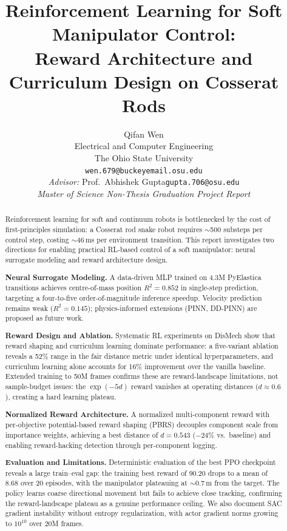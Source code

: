 \documentclass[11pt]{article}
\title{%
  \textbf{Reinforcement Learning for Soft Manipulator Control:}\\[0.3em]
  \large Reward Architecture and Curriculum Design on Cosserat Rods%
}
\author{%
  Qifan Wen\\
  \small Electrical and Computer Engineering\\
  \small The Ohio State University\\
  \small \texttt{wen.679@buckeyemail.osu.edu}\\[0.6em]
  \small \textit{Advisor:} Prof.\ Abhishek Gupta\quad\small\texttt{gupta.706@osu.edu}\\[1.5em]
  \small\textit{Master of Science Non-Thesis Graduation Project Report}%
}
\date{}
\begin{document}

\maketitle
\thispagestyle{empty}

\newpage

\begin{abstract}
\noindent
Reinforcement learning for soft and continuum robots is bottlenecked by the cost of first-principles simulation: a Cosserat rod snake robot requires ${\sim}$500 substeps per control step, costing ${\sim}$46\,ms per environment transition. This report investigates two directions for enabling practical RL-based control of a soft manipulator: neural surrogate modeling and reward architecture design.

\medskip\noindent\textbf{Neural Surrogate Modeling.}
A data-driven MLP trained on 4.3M PyElastica transitions achieves centre-of-mass position $R^2 = 0.852$ in single-step prediction, targeting a four-to-five order-of-magnitude inference speedup. Velocity prediction remains weak ($R^2 = 0.145$); physics-informed extensions (PINN, DD-PINN) are proposed as future work.

\medskip\noindent\textbf{Reward Design and Ablation.}
Systematic RL experiments on DisMech show that reward shaping and curriculum learning dominate performance: a five-variant ablation reveals a 52\% range in the fair distance metric under identical hyperparameters, and curriculum learning alone accounts for 16\% improvement over the vanilla baseline. Extended training to 50M frames confirms these are reward-landscape limitations, not sample-budget issues: the $\exp(-5d)$ reward vanishes at operating distances ($d \approx 0.6$), creating a hard learning plateau.

\medskip\noindent\textbf{Normalized Reward Architecture.}
A normalized multi-component reward with per-objective potential-based reward shaping (PBRS) decouples component scale from importance weights, achieving a best distance of $d = 0.543$ ($-$24\% vs.\ baseline) and enabling reward-hacking detection through per-component logging.

\medskip\noindent\textbf{Evaluation and Limitations.}
Deterministic evaluation of the best PPO checkpoint reveals a large train--eval gap: the training best reward of 90.20 drops to a mean of 8.68 over 20 episodes, with the manipulator plateauing at ${\sim}$0.7\,m from the target. The policy learns coarse directional movement but fails to achieve close tracking, confirming the reward-landscape plateau as a genuine performance ceiling. We also document SAC gradient instability without entropy regularization, with actor gradient norms growing to $10^{10}$ over 20M frames.
\end{abstract}
\end{document}
